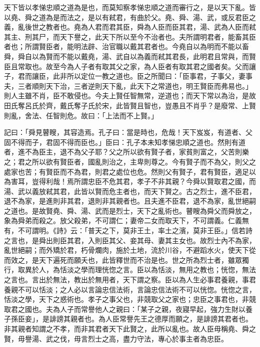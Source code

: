 
\begin{pinyinscope}
天下皆以孝悌忠順之道為是也，而莫知察孝悌忠順之道而審行之，是以天下亂。皆以堯、舜之道為是而法之，是以有弒君，有曲於父。堯、舜、湯、武，或反君臣之義，亂後世之教者也。堯為人君而君其臣，舜為人臣而臣其君，湯、武為人臣而弒其主、刑其尸，而天下譽之，此天下所以至今不治者也。夫所謂明君者，能畜其臣者也；所謂賢臣者，能明法辟、治官職以戴其君者也。今堯自以為明而不能以畜舜，舜自以為賢而不能以戴堯，湯、武自以為義而弒其君長，此明君且常與，而賢臣且常取也。故至今為人子者有取其父之家，為人臣者有取其君之國者矣。父而讓子，君而讓臣，此非所以定位一教之道也。臣之所聞曰：「臣事君，子事父，妻事夫，三者順則天下治，三者逆則天下亂，此天下之常道也，明王賢臣而弗易也。」則人主雖不肖，臣不敢侵也。今夫上賢任智無常，逆道也；而天下常以為治，是故田氏奪呂氏於齊，戴氏奪子氏於宋，此皆賢且智也，豈愚且不肖乎？是廢常、上賢則亂，舍法、任智則危。故曰：「上法而不上賢。」

記曰：「舜見瞽瞍，其容造焉。孔子曰：當是時也，危哉！天下岌岌，有道者、父固不得而子，君固不得而臣也。」臣曰：孔子本未知孝悌忠順之道也。然則有道者，進不為臣主，退不為父子耶？父之所以欲有賢子者，家貧則富之，父苦則樂之；君之所以欲有賢臣者，國亂則治之，主卑則尊之。今有賢子而不為父，則父之處家也苦；有賢臣而不為君，則君之處位也危。然則父有賢子，君有賢臣，適足以為害耳，豈得利哉！焉所謂忠臣不危其君，孝子不非其親？今舜以賢取君之國，而湯、武以義放弒其君，此皆以賢而危主者也，而天下賢之。古之烈士，進不臣君，退不為家，是進則非其君，退則非其親者也。且夫進不臣君，退不為家，亂世絕嗣之道也。是故賢堯、舜、湯、武而是烈士，天下之亂術也。瞽瞍為舜父而舜放之，象為舜弟而殺之。放父殺弟，不可謂仁；妻帝二女而取天下，不可謂義。仁義無有，不可謂明。《詩》云：「普天之下，莫非王土，率土之濱，莫非王臣。」信若詩之言也，是舜出則臣其君，入則臣其父、妾其母、妻其主女也。故烈士內不為家，亂世絕嗣；而外矯於君，朽骨爛肉，施於土地，流於川谷，不避蹈水火，使天下從而效之，是天下遍死而願夭也，此皆釋世而不治是也。世之所為烈士者，雖眾獨行，取異於人，為恬淡之學而理恍惚之言。臣以為恬淡，無用之教也；恍惚，無法之言也。言出於無法，教出於無用者，天下謂之察。臣以為人生必事君養親，事君養親不可以恬淡；之人必以言論忠信法術，言論忠信法術不可以恍惚。恍惚之言，恬淡之學，天下之惑術也。孝子之事父也，非競取父之家也；忠臣之事君也，非競取君之國也。夫為人子而常譽他人之親曰：「某子之親，夜寢早起，強力生財以養子孫臣妾」，是誹謗其親者也。為人臣常譽先王之德厚而願之，是誹謗其君者也。非其親者知謂之不孝，而非其君者天下此賢之，此所以亂也。故人臣毋稱堯、舜之賢，毋譽湯、武之伐，毋言烈士之高，盡力守法，專心於事主者為忠臣。


\end{pinyinscope}
